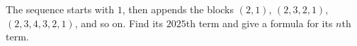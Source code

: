 The sequence starts with $1$, then appends the blocks $(2,1)$, $(2,3,2,1)$, $(2,3,4,3,2,1)$, and so on. Find its $2025$th term and give a formula for its $n$th term.
